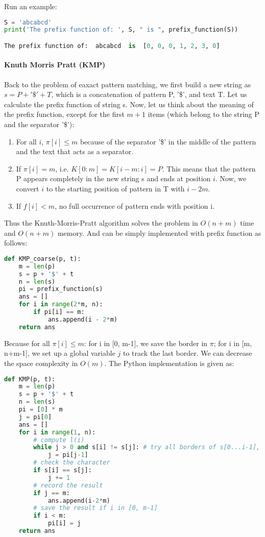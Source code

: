 \documentclass[../main.tex]{subfiles}
\begin{document}
Run an example:
\begin{lstlisting}[language=Python]
S = 'abcabcd'
print('The prefix function of: ', S, " is ", prefix_function(S))

The prefix function of:  abcabcd  is  [0, 0, 0, 1, 2, 3, 0]
\end{lstlisting}

\paragraph{Knuth Morris Pratt (KMP)} Back to the problem of eaxact pattern matching, we first build a new string as $s = P+'\$'+T$,  which is a concatenation of pattern P, '\$', and text T. Let us calculate the prefix function of string s. Now, let us think about the meaning of the prefix function, except for the first $m+1$ items (which belong to the string P and the separator '\$'): 
\begin{enumerate}
    \item For all $i$, $\pi[i] \leq m$ because of the separator '\$' in the middle of the pattern and the text that acts as a separator. 
    \item If $\pi[i] = m$, i.e. $K[0:m] = K[i-m:i] = P$. This means that the pattern P appears completely in the new string s and ends at position $i$. Now, we convert $i$ to the starting position of pattern in T with $i-2m$.
    \item If $f[i] < m$, no full occurrence of pattern ends with position i. 
\end{enumerate}

Thus the Knuth-Morris-Pratt algorithm solves the problem in $O(n+m)$ time and $O(n+m)$ memory. And can be simply implemented with prefix function as follows:
\begin{lstlisting}[language=Python]
def KMP_coarse(p, t):
    m = len(p)
    s = p + '$' + t
    n = len(s)
    pi = prefix_function(s)
    ans = []
    for i in range(2*m, n):
        if pi[i] == m:
            ans.append(i - 2*m)
    return ans
\end{lstlisting}

Because for all $\pi[i] \leq m$: for i in [0, m-1], we save the border in $\pi$; for i in [m, n+m-1], we set up a global variable $j$ to track the last border. We can decrease the space complexity in $O(m)$.
The Python implementation is given as: 
\begin{lstlisting}[language=Python]
def KMP(p, t):
    m = len(p)
    s = p + '$' + t
    n = len(s)
    pi = [0] * m
    j = pi[0]
    ans = []
    for i in range(1, n):
        # compute l(i)
        while j > 0 and s[i] != s[j]: # try all borders of s[0...i-1], from the longest to the shortest
            j = pi[j-1]
        # check the character
        if s[i] == s[j]:
            j += 1
        # record the result
        if j == m:
            ans.append(i-2*m)
        # save the result if i in [0, m-1]
        if i < m:
            pi[i] = j
    return ans
\end{lstlisting}
\end{document}
